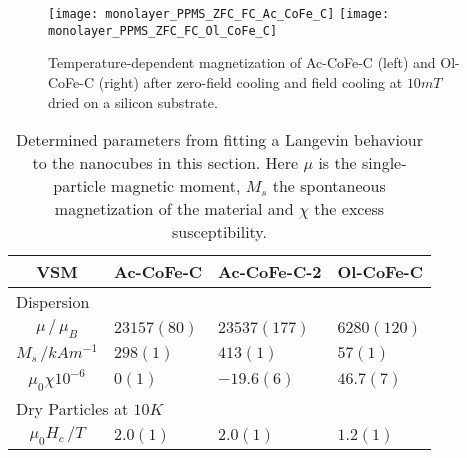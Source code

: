 \documentclass[\main/dresen_thesis.tex]{subfiles}
\begin{document}
  \begin{figure}[tb]
    \centering
    \texttt{[image: monolayer\_PPMS\_ZFC\_FC\_Ac\_CoFe\_C]}
    \texttt{[image: monolayer\_PPMS\_ZFC\_FC\_Ol\_CoFe\_C]}
    \caption{\label{fig:monolayers:nanoparticle:vsm10K}Temperature-dependent magnetization of Ac-CoFe-C (left) and Ol-CoFe-C (right) after zero-field cooling and field cooling at $10 \unit{mT}$ dried on a silicon substrate.}
  \end{figure}

  \begin{table}[!htbp]
    \centering
    \caption{\label{tab:monolayers:nanoparticle:vsm}Determined parameters from fitting a Langevin behaviour to the nanocubes in this section. Here $\mu$ is the single-particle magnetic moment, $M_s$ the spontaneous magnetization of the material and $\chi$ the excess susceptibility.}
    \begin{tabular}{ c | l | l | l}
      \rule{0pt}{2ex} \textbf{VSM} & Ac-CoFe-C & Ac-CoFe-C-2 & Ol-CoFe-C \\
      \hline
      \multicolumn{4}{l}{Dispersion} \\
      \hline
      \rule{0pt}{2ex} $\mu \, / \, \mu_B$         & $23157(80)$   & $23537(177)$ & $6280(120)$\\
      \rule{0pt}{2ex} $M_s \, /  \unit{kAm^{-1}}$ & $298(1)$      & $413(1)$     & $57(1)$\\
      \rule{0pt}{2ex} $\mu_0 \chi \unit{10^{-6}}$ & $0(1)$        & $-19.6(6)$   & $46.7(7)$\\
      \hline
      \multicolumn{4}{l}{Dry Particles at $10 \unit{K}$} \\
      \hline
      \rule{0pt}{2ex} $\mu_0 H_c \, /  \unit{T}$  & $2.0(1)$      & $2.0(1)$      & $1.2(1)$\\
      \hline
    \end{tabular}
  \end{table}
\end{document}
